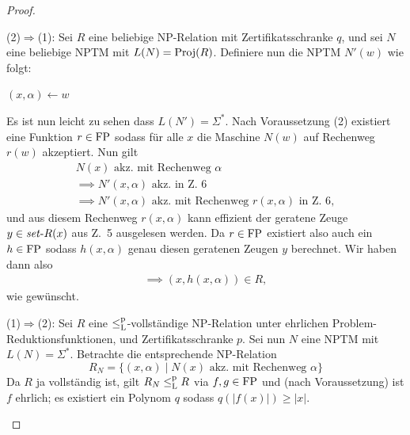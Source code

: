 \begin{proof}
\begin{prooflist}[label={}]
\item (2)$\Rightarrow$(1): 
    Sei $R$ eine beliebige NP-Relation mit Zertifikatsschranke $q$, und
    sei $N$ eine beliebige NPTM mit $L(N)=\operatorname{Proj}(R)$. Definiere nun die NPTM $N'(w)$ wie folgt:\\
    \begin{algorithm}[H]
        $(x, \alpha)\gets w$\;
    \end{algorithm}
    Es ist nun leicht zu sehen dass $L(N')=\Sigma^*$. Nach Voraussetzung (2) existiert eine Funktion $r\in\mathrm{FP}$ sodass für alle $x$ die Maschine $N(w)$ auf Rechenweg $r(w)$ akzeptiert.
    Nun gilt
    \begin{gather*}
        N(x) \text{ akz. mit Rechenweg $\alpha$}\\
        \implies N'(x,\alpha) \text{ akz. in Z.~6}\\
        \implies N'(x,\alpha) \text{ akz. mit Rechenweg $r(x,\alpha)$ in Z.~6},
    \end{gather*}
    und aus diesem Rechenweg $r(x,\alpha)$ kann effizient der geratene Zeuge $y\in \mathit{set}\text{-}{}R(x)$ aus Z.~5 ausgelesen werden.
    Da $r\in\mathrm{FP}$ existiert also auch ein $h\in\mathrm{FP}$ sodass $h(x,\alpha)$ genau diesen geratenen Zeugen $y$ berechnet.
    Wir haben dann also
    \begin{gather*}
        \implies (x, h(x, \alpha))\in R,
    \end{gather*}
    wie gewünscht.

\item (1)$\Rightarrow$(2): 
    Sei $R$ eine $\leq_\mathrm{L}^\mathrm{p}$-vollständige NP-Relation unter ehrlichen Problem-Reduktionsfunktionen, und Zertifikatsschranke $p$.
    Sei nun $N$ eine NPTM mit $L(N)=\Sigma^*$. Betrachte die entsprechende NP-Relation
    \[ R_N = \{ (x,\alpha) \mid N(x) \text{ akz. mit Rechenweg $\alpha$} \} \]
    Da $R$ ja vollständig ist, gilt $R_N\leq_\mathrm{L}^\mathrm{p} R$ via $f,g\in\mathrm{FP}$ und (nach Voraussetzung) ist $f$ ehrlich; es existiert ein Polynom $q$ sodass $q(|f(x)|)\geq |x|$.


\end{prooflist}
\end{proof}
